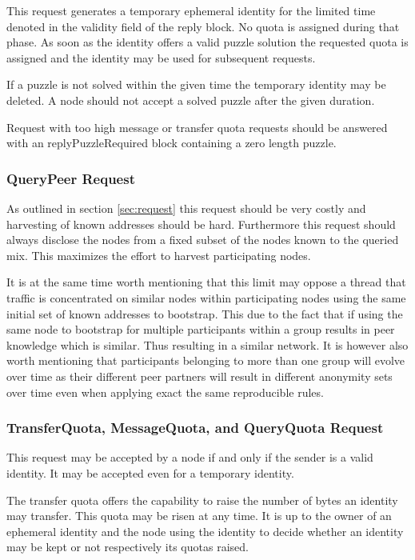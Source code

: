 This request generates a temporary ephemeral identity for the limited time denoted in the validity field of the reply block. No quota is assigned during that phase. As soon as the identity offers a valid puzzle solution the requested quota is assigned and the identity may be used for subsequent requests.

If a puzzle is not solved within the given time the temporary identity may be deleted. A node should not accept a solved puzzle after the given duration. 

Request with too high message or transfer quota requests should be answered with an replyPuzzleRequired block containing a zero length puzzle.

\subsubsection{QueryPeer Request}
As outlined in section \ref{sec:request} this request should be very costly and harvesting of known addresses should be hard. Furthermore this request should always  disclose the nodes from a fixed subset of the nodes known to the queried mix. This maximizes the effort to harvest participating nodes.

It is at the same time worth mentioning that this limit may oppose a thread that traffic is concentrated on similar nodes within participating nodes using the same initial set of known addresses to bootstrap. This due to the fact that if using the same node to bootstrap for multiple participants within a group results in peer knowledge which is similar. Thus resulting in a similar network. It is however also worth mentioning that participants belonging to more than one group will evolve over time as their different peer partners will result in different anonymity sets over time even when applying exact the same reproducible rules.

\subsubsection{TransferQuota, MessageQuota,  and QueryQuota Request}
This request may be accepted by a node if and only if the sender is a valid identity. It may be accepted even for a temporary identity.

The transfer quota offers the capability to raise the number of bytes an identity may transfer. This quota may be risen at any time. It is up to the owner of an ephemeral identity and the node using the identity to decide whether an identity may be kept or not respectively its quotas raised.

